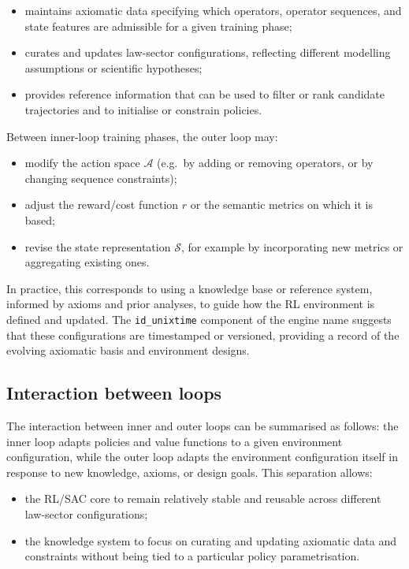 \documentclass[11pt]{book}
\theoremstyle{plain}
\theoremstyle{definition}
\theoremstyle{remark}
\begin{document}
\begin{itemize}
  \item maintains axiomatic data specifying which operators, operator
        sequences, and state features are admissible for a given
        training phase;
  \item curates and updates law-sector configurations, reflecting
        different modelling assumptions or scientific hypotheses;
  \item provides reference information that can be used to filter
        or rank candidate trajectories and to initialise or constrain
        policies.
\end{itemize}

Between inner-loop training phases, the outer loop may:

\begin{itemize}
  \item modify the action space $\mathcal{A}$ (e.g.\ by adding or
        removing operators, or by changing sequence constraints);
  \item adjust the reward/cost function $r$ or the semantic metrics
        on which it is based;
  \item revise the state representation $\mathcal{S}$, for example by
        incorporating new metrics or aggregating existing ones.
\end{itemize}

In practice, this corresponds to using a knowledge base or reference
system, informed by axioms and prior analyses, to guide how the RL
environment is defined and updated. The \texttt{id\_unixtime} component
of the engine name suggests that these configurations are timestamped
or versioned, providing a record of the evolving axiomatic basis and
environment designs.

\subsection*{Interaction between loops}

The interaction between inner and outer loops can be summarised as
follows: the inner loop adapts policies and value functions to a given
environment configuration, while the outer loop adapts the environment
configuration itself in response to new knowledge, axioms, or design
goals. This separation allows:

\begin{itemize}
  \item the RL/SAC core to remain relatively stable and reusable
        across different law-sector configurations;
  \item the knowledge system to focus on curating and updating
        axiomatic data and constraints without being tied to a
        particular policy parametrisation.
\end{itemize}
\end{document}
